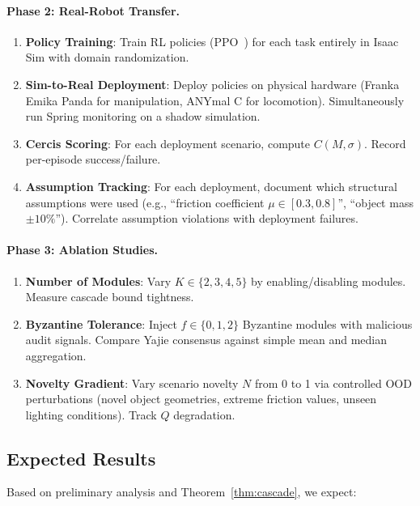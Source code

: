 \documentclass[11pt,twocolumn]{article}
\theoremstyle{definition}
\begin{document}
\paragraph{Phase 2: Real-Robot Transfer.}
\begin{enumerate}[leftmargin=*,nosep]
  \item \textbf{Policy Training}: Train RL policies (PPO~\cite{schulman2017ppo})
    for each task entirely in Isaac Sim with domain randomization.
  \item \textbf{Sim-to-Real Deployment}: Deploy policies on physical hardware
    (Franka Emika Panda for manipulation, ANYmal C for locomotion).
    Simultaneously run Spring monitoring on a shadow simulation.
  \item \textbf{Cercis Scoring}: For each deployment scenario, compute
    $C(M,\sigma)$.  Record per-episode success/failure.
  \item \textbf{Assumption Tracking}: For each deployment, document which
    structural assumptions were used (e.g., ``friction coefficient $\mu \in
    [0.3, 0.8]$'', ``object mass $\pm 10\%$'').  Correlate assumption
    violations with deployment failures.
\end{enumerate}

\paragraph{Phase 3: Ablation Studies.}
\begin{enumerate}[leftmargin=*,nosep]
  \item \textbf{Number of Modules}: Vary $K \in \{2,3,4,5\}$ by
    enabling/disabling modules.  Measure cascade bound tightness.
  \item \textbf{Byzantine Tolerance}: Inject $f \in \{0,1,2\}$ Byzantine
    modules with malicious audit signals.  Compare Yajie consensus against
    simple mean and median aggregation.
  \item \textbf{Novelty Gradient}: Vary scenario novelty $N$ from 0 to 1 via
    controlled OOD perturbations (novel object geometries, extreme friction
    values, unseen lighting conditions).  Track $Q$ degradation.
\end{enumerate}

\subsection{Expected Results}

Based on preliminary analysis and Theorem~\ref{thm:cascade}, we expect:
\end{document}
